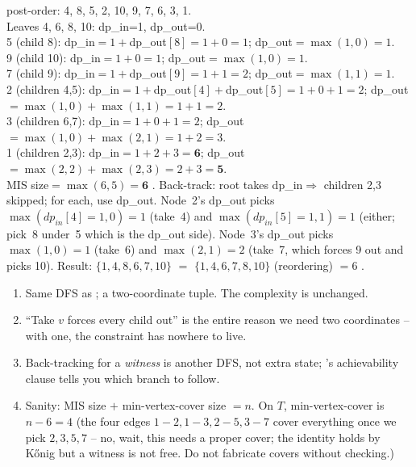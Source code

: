 \begin{tracebox}
post-order: 4, 8, 5, 2, 10, 9, 7, 6, 3, 1.\\
Leaves 4, 6, 8, 10: dp\_in=1, dp\_out=0.\\
5 (child 8): dp\_in$=1+$dp\_out$[8]=1+0=1$; dp\_out$=\max(1,0)=1$.\\
9 (child 10): dp\_in$=1+0=1$; dp\_out$=\max(1,0)=1$.\\
7 (child 9): dp\_in$=1+$dp\_out$[9]=1+1=2$; dp\_out$=\max(1,1)=1$.\\
2 (children 4,5): dp\_in$=1+$dp\_out$[4]+$dp\_out$[5]=1+0+1=2$;
dp\_out$=\max(1,0)+\max(1,1)=1+1=2$.\\
3 (children 6,7): dp\_in$=1+0+1=2$; dp\_out$=\max(1,0)+\max(2,1)=1+2=3$.\\
1 (children 2,3): dp\_in$=1+2+3=\mathbf{6}$;
dp\_out$=\max(2,2)+\max(2,3)=2+3=\mathbf{5}$.\\
MIS size$=\max(6,5)=\mathbf{6}$ \checkmark. Back-track: root takes
dp\_in$\Rightarrow$ children 2,3 skipped; for each, use dp\_out. Node~2's
dp\_out picks $\max(\mathit{dp}_{\mathit{in}}[4]=1,0)=1$ (take~4) and
$\max(\mathit{dp}_{\mathit{in}}[5]=1,1)=1$ (either; pick~8 under~5 which
is the dp\_out side). Node~3's dp\_out picks $\max(1,0)=1$ (take~6) and
$\max(2,1)=2$ (take~7, which forces 9 out and picks 10). Result:
$\{1,4,8,6,7,10\}$ $=$ $\{1,4,6,7,8,10\}$ (reordering) $=6$ \checkmark.
\end{tracebox}

\begin{insightbox}
\begin{enumerate}[nosep, leftmargin=1.6em]
  \item Same DFS as ; a two-coordinate tuple. The
        complexity is unchanged.
  \item ``Take $v$ forces every child out'' is the entire reason we need
        two coordinates -- with one, the constraint has nowhere to live.
  \item Back-tracking for a \emph{witness} is another DFS, not extra
        state; 's achievability clause tells you
        which branch to follow.
  \item Sanity: MIS size $+$ min-vertex-cover size $=n$. On $T$,
        min-vertex-cover is $n-6=4$ (the four edges $1\!-\!2,1\!-\!3,2\!-\!5,
        3\!-\!7$ cover everything once we pick $2,3,5,7$ -- no, wait, this
        needs a proper cover; the identity holds by K{\H{o}}nig but a
        witness is not free. Do not fabricate covers without checking.)
\end{enumerate}
\end{insightbox}


